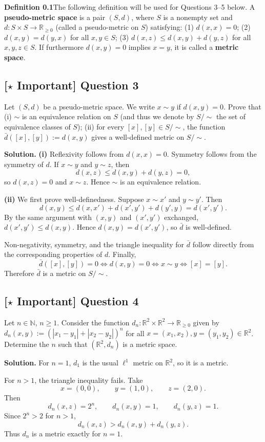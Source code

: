 \documentclass{article}
\newcommand{\R}{\mathbb{R}}
\newcommand{\N}{\mathbb{N}}
\newcommand{\important}{\texorpdfstring{\textbf{[\(\star\) Important]}}{[Important]}}
\newenvironment{solution}{\par\noindent\textbf{Solution.}\quad}{\par}
\begin{document}
\medskip\noindent\textbf{Definition 0.1}\quad The following definition will be used for Questions 3--5 below. A \textbf{pseudo-metric space} is a pair $(S, d)$, where $S$ is a nonempty set and $d : S \times S \to \R_{\ge 0}$ (called a pseudo-metric on $S$) satisfying: (1) $d(x, x) = 0$; (2) $d(x, y) = d(y, x)$ for all $x, y \in S$; (3) $d(x, z) \le d(x, y) + d(y, z)$ for all $x, y, z \in S$. If furthermore $d(x, y) = 0$ implies $x = y$, it is called a \textbf{metric space}.

\subsection{\important{} Question 3}
Let $(S, d)$ be a pseudo-metric space. We write $x \sim y$ if $d(x, y) = 0$. Prove that (i) $\sim$ is an equivalence relation on $S$ (and thus we denote by $S/\!\sim$ the set of equivalence classes of $S$); (ii) for every $[x], [y] \in S/\!\sim$, the function $\bar d([x], [y]) := d(x, y)$ gives a well-defined metric on $S/\!\sim$.

\begin{solution}
\textbf{(i)} Reflexivity follows from $d(x,x)=0$. Symmetry follows from
the symmetry of $d$. If $x\sim y$ and $y\sim z$, then
\[
  d(x,z)\le d(x,y)+d(y,z)=0,
\]
so $d(x,z)=0$ and $x\sim z$. Hence $\sim$ is an equivalence relation.

\textbf{(ii)} We first prove well-definedness. Suppose $x\sim x'$ and
$y\sim y'$. Then
\[
  d(x,y)\le d(x,x')+d(x',y')+d(y',y)=d(x',y').
\]
By the same argument with $(x,y)$ and $(x',y')$ exchanged,
$d(x',y')\le d(x,y)$. Hence $d(x,y)=d(x',y')$, so $\bar d$ is
well-defined.

Non-negativity, symmetry, and the triangle inequality for $\bar d$ follow
directly from the corresponding properties of $d$. Finally,
\[
  \bar d([x],[y])=0
  \iff d(x,y)=0
  \iff x\sim y
  \iff [x]=[y].
\]
Therefore $\bar d$ is a metric on $S/\!\sim$.
\end{solution}

\subsection{\important{} Question 4}
Let $n \in \N$, $n \ge 1$. Consider the function $d_n : \R^2 \times \R^2 \to \R_{\ge 0}$ given by $d_n(x, y) := (|x_1 - y_1| + |x_2 - y_2|)^n$ for all $x = (x_1, x_2), y = (y_1, y_2) \in \R^2$. Determine the $n$ such that $(\R^2, d_n)$ is a metric space.

\begin{solution}
For $n=1$, $d_1$ is the usual $\ell^1$ metric on $\R^2$, so it is a
metric.

For $n>1$, the triangle inequality fails. Take
\[
  x=(0,0),\qquad y=(1,0),\qquad z=(2,0).
\]
Then
\[
  d_n(x,z)=2^n,\qquad d_n(x,y)=1,\qquad d_n(y,z)=1.
\]
Since $2^n>2$ for $n>1$,
\[
  d_n(x,z)>d_n(x,y)+d_n(y,z).
\]
Thus $d_n$ is a metric exactly for $n=1$.
\end{solution}
\end{document}
